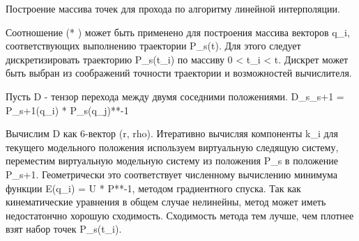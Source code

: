 \documentclass[12pt,a4paper,titlepage]{article}
\begin{document}
Построение массива точек для прохода по алгоритму линейной интерполяции. 

Соотношение (* ) может быть применено для построения массива векторов q\_i, соответствующих выполнению траектории P\_s(t). Для этого следует дискретизировать траекторию P\_s(t\_i) по массиву 0 < t\_i < t. Дискрет может быть выбран из соображений точности траектории и возможностей вычислителя.

Пусть D - тензор перехода между двумя соседними положениями.
D\_s\_s+1 = P\_s+1(q\_i) * P\_s(q\_j)**-1

Вычислим D как 6-вектор (r, rho). Итеративно вычисляя компоненты k\_i для текущего модельного положения используем виртуальную следящую систему, переместим виртуальную модельную систему из положения P\_s в положение P\_s+1. Геометрически это соответствует численному вычислению минимума функции E(q\_i) = U * P**-1, методом градиентного спуска. Так как кинематические уравнения в общем случае нелинейны, метод может иметь недостатончно хорошую сходимость. Сходимость метода тем лучше, чем плотнее взят набор точек P\_s(t\_i).  
\end{document}
